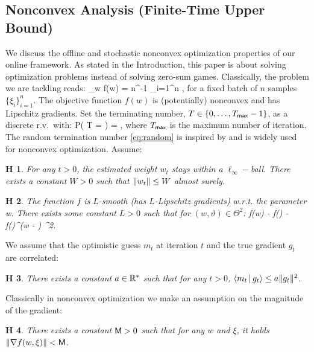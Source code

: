 \documentclass[11pt]{article}
\newtheorem{assumption}{H\!\!}
\theoremstyle{k}
\begin{document}
\subsection{Nonconvex Analysis (Finite-Time Upper Bound)}
We discuss the offline and stochastic nonconvex optimization properties of our online framework.
As stated in the Introduction, this paper is about solving optimization problems instead of solving zero-sum games.  
Classically, the problem we are tackling reads:
\beq\label{eq:minproblem}
\min \limits_{w \in \Theta} f(w) \eqdef  \EE[ f(w, \xi)] = n^{-1} \sum_{i=1}^n  \EE[f(w, \xi_i)] \eqsp,
\eeq
for a fixed batch of $n$ samples $\{ \xi_i \}_{i=1}^n$.
The objective function $f(w)$ is (potentially) nonconvex and has Lipschitz gradients.
Set the terminating number, $T \in \{0,\dots,T_{\sf max}-1\}$, as a discrete r.v.~with:
\beq \label{eq:random}
   P( T = \ell ) =  \eqsp,
\eeq
where $T_{\sf max}$ is the maximum number of iteration.
The random termination number \eqref{eq:random} is inspired by \citep{ghadimi2013stochastic} and is widely used for nonconvex optimization. 
Assume:
\begin{assumption}\label{ass:boundedparam}
For any $t >0$, the estimated weight $w_t$ stays within a $\ell_{\infty}-$ball. There exists a constant $W >0$ such that $\left\Vert w_t \right\Vert \leq W$ almost surely.
\end{assumption}
\begin{assumption}\label{ass:smooth}
The function $f$ is $L$-smooth (has $L$-Lipschitz gradients) w.r.t. the parameter w.
There exists some constant $L > 0$ such that for $(w, \vartheta) \in \Theta^2$:
\beq\notag
f(w) - f(\vartheta) - \nabla f(\vartheta)^\top(w - \vartheta) \leq {} ^2\eqsp.
\eeq
\end{assumption}
We assume that the optimistic guess $m_t$ at iteration $t$ and the true gradient $g_t$ are correlated:
\begin{assumption}\label{ass:guessbound}
There exists a constant $a \in \mathbb{R}^* $ such that for any $t >0$, $ \left\langle m_t\,|\, g_t \right\rangle  \leq a \|g_t\|^2$.
\end{assumption}
Classically in nonconvex optimization \citep{ghadimi2013stochastic} we make an assumption on the magnitude of the gradient:
\begin{assumption}\label{ass:bounded}
There exists a constant $\mathsf{M} >0$ such that for any $w$ and $\xi$, it holds $\left\Vert \nabla f(w, \xi) \right\Vert < \mathsf{M}$.
\end{assumption}
\end{document}
